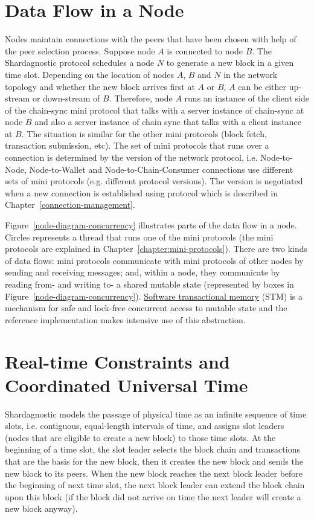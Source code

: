 \section{Data Flow in a Node}
Nodes maintain connections with the peers that have been chosen
with help of the peer selection process.
Suppose node $A$ is connected to node $B$.
The Shardagnostic protocol schedules a node $N$ to generate a new block in a given time slot.
Depending on the location of nodes $A$, $B$ and $N$ in the network topology and whether the new
block arrives first at $A$ or $B$, $A$ can be either up-stream or down-stream of $B$.
Therefore, node $A$ runs an instance of the client side of the chain-sync mini protocol
that talks with a server instance of chain-sync at node $B$ and also a server instance of chain sync
that talks with a client instance at $B$.
The situation is similar for the other mini protocols (block fetch, transaction submission, etc).
The set of mini protocols that runs over a connection is determined by the version of the network
protocol, i.e.  Node-to-Node, Node-to-Wallet and Node-to-Chain-Consumer
connections use different sets of mini protocols (e.g. different protocol
versions).  The version is negotiated when a new connection is established
using protocol which is described in Chapter~\ref{connection-management}.

Figure~\ref{node-diagram-concurrency} illustrates parts of the data flow in a node.
Circles represents a thread that runs one of the mini protocols (the mini protocols are explained in
Chapter~\ref{chapter:mini-protocols}).
There are two kinds of data flows:
mini protocols communicate with mini protocols of other nodes by sending and receiving messages;
and, within a node, they communicate by reading from- and writing to- a shared
mutable state (represented by boxes in Figure~\ref{node-diagram-concurrency}).
\href{https://en.wikipedia.org/wiki/Software_transactional_memory}{Software transactional memory}
(STM) is a mechanism for safe and lock-free concurrent
access to mutable state and the reference implementation makes intensive use of this abstraction.

\section{Real-time Constraints and Coordinated Universal Time}
Shardagnostic models the passage of physical time as an infinite sequence of time slots,
i.e. contiguous, equal-length intervals of time,
and assigns slot leaders (nodes that are eligible to create a new block) to those time slots.
At the beginning of a time slot, the slot leader selects the block chain and transactions that are the basis
for the new block, then it creates the new block and sends the new block to its peers.
When the new block reaches the next block leader before the beginning of next time slot,
the next block leader can extend the block chain upon this block (if the block
did not arrive on time the next leader will create a new block anyway).

